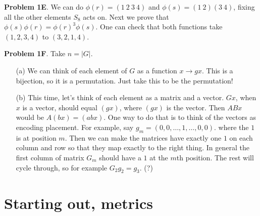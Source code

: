 \documentclass[11pt]{scrreport}
\begin{document}
\textbf{Problem 1E}. We can do $\phi(r)=(1 \ 2 \ 3 \ 4)$ and $\phi(s) = (1 \ 2)(3 \ 4)$, fixing all the other elements $S_8$ acts on. Next we prove that $\phi(s)\phi(r)=\phi(r)^3\phi(s)$. One can check that both functions take $(1,2,3,4)$ to $(3,2,1,4)$. 

\textbf{Problem 1F}. Take $n=|G|$.
\begin{itemize}
    \item[(a)] We can think of each element of $G$ as a function $x\to gx$. This is a bijection, so it is a permutation. Just take this to be the permutation!
    \item[(b)] This time, let's think of each element as a matrix and a vector. $Gx$, when $x$ is a vector, should equal $(gx)$, where $(gx)$ is the vector. Then $ABx$ would be $A(bx) = (abx)$. One way to do that is to think of the vectors as encoding placement. For example, say $g_m = (0,0,\dots, 1, \dots, 0, 0).$ where the $1$ is at position $m$. Then we can make the matrices have exactly one $1$ on each column and row so that they map exactly to the right thing. In general the first column of matrix $G_m$ should have a $1$ at the $m$th position. The rest will cycle through, so for example $G_2g_2=g_3$. (?)
\end{itemize}
\chapter{Starting out, metrics}
\end{document}
